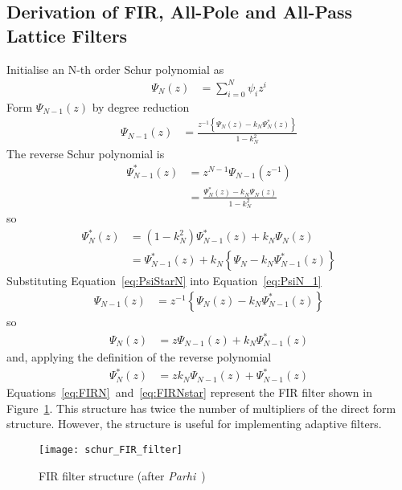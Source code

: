 \documentclass[a4paper,twoside,10pt,english]{report}
\begin{document}
\subsection{Derivation of FIR, All-Pole and All-Pass Lattice Filters}
Initialise an N-th order Schur polynomial as
\begin{align*}
\Psi_{N}\left(z\right) & = \sum_{i=0}^{N}\psi_{i}z^{i}
\end{align*}
Form $\Psi_{N-1}\left(z\right)$ by degree reduction
\begin{align}
\Psi_{N-1}\left(z\right) & = \frac{z^{-1}\left\{ \Psi_{N}\left(z\right)-k_{N}\Psi_{N}^{*}\left(z\right)\right\} }{1-k_{N}^{2}}\label{eq:PsiN_1}
\end{align}
The reverse Schur polynomial is
\begin{align}
\Psi_{N-1}^{*}\left(z\right) & = z^{N-1}\Psi_{N-1}(z^{-1})\\
 & = \frac{\Psi_{N}^{*}\left(z\right)-k_{N}\Psi_{N}\left(z\right)}{1-k_{N}^{2}}\label{eq:PsiN_1Star}
\end{align}
so
\begin{align}
\Psi_{N}^{*}\left(z\right) & = \left(1-k_{N}^{2}\right)\Psi_{N-1}^{*}\left(z\right)+k_{N}\Psi_{N}\left(z\right)\nonumber \\
 & = \Psi_{N-1}^{*}\left(z\right)+k_{N}\left\{ \Psi_{N}-k_{N}\Psi_{N-1}^{*}\left(z\right)\right\} \label{eq:PsiStarN}
\end{align}
Substituting Equation~\ref{eq:PsiStarN} into Equation~\ref{eq:PsiN_1}
\begin{align*}
\Psi_{N-1}\left(z\right) & = z^{-1}\left\{ \Psi_{N}\left(z\right)-k_{N}\Psi_{N-1}^{*}\left(z\right)\right\} 
\end{align*}
so
\begin{align}
\Psi_{N}\left(z\right) & = z\Psi_{N-1}\left(z\right)+k_{N}\Psi_{N-1}^{*}\left(z\right)\label{eq:FIRN}
\end{align}
and, applying the definition of the reverse polynomial
\begin{align}
\Psi_{N}^{*}\left(z\right) & = zk_{N}\Psi_{N-1}\left(z\right)+\Psi_{N-1}^{*}\left(z\right)\label{eq:FIRNstar}
\end{align}
Equations~\ref{eq:FIRN}~and~\ref{eq:FIRNstar} represent the FIR filter
shown in Figure~\ref{fig:FIR-filter-structure}. This structure
has twice the number of multipliers of the direct form structure.
However, the structure is useful for implementing adaptive filters.
\begin{figure}[!htbp]
\begin{center}
\texttt{[image: schur\_FIR\_filter]}
\caption{FIR filter structure (after 
\emph{Parhi}~\cite[Fig. 12.8]{Parhi_VLSIDigitalSignalProcessingSystems})}
\label{fig:FIR-filter-structure}
\end{center}
\end{figure}
\end{document}
